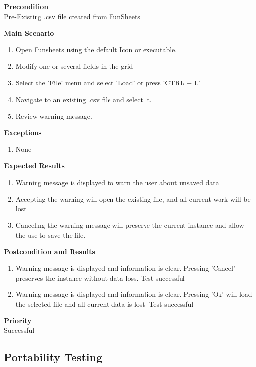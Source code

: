 \documentclass[12pt]{article}
\begin{document}
\noindent
{\bf Precondition}\\
Pre-Existing .csv file created from FunSheets

\noindent
{\bf Main Scenario}\\
\vspace*{-0.2in}
\begin{enumerate}
\item Open Funsheets using the default Icon or executable.
\item Modify one or several fields in the grid
\item Select the 'File' menu and select 'Load' or press 'CTRL + L'
\item Navigate to an existing .csv file and select it.
\item Review warning message.
\end{enumerate}

{\bf Exceptions}\
\begin{enumerate}
\item None
\end{enumerate}

{\bf Expected Results}\
\begin{enumerate}
\item Warning message is displayed to warn the user about unsaved data
\item Accepting the warning will open the existing file, and all current work will be lost
\item Canceling the warning message will preserve the current instance and allow the use to save the file.
\end{enumerate}

\noindent
{\bf Postcondition and Results}\
\begin{enumerate}
\item Warning message is displayed and information is clear. Pressing 'Cancel' preserves the instance without data loss. Test successful
\item Warning message is displayed and information is clear. Pressing 'Ok' will load the selected file and all current data is lost. Test successful
\end{enumerate}

\noindent
{\bf Priority}\\
Successful
\noindent
{}
\subsection{Portability Testing}
\end{document}
